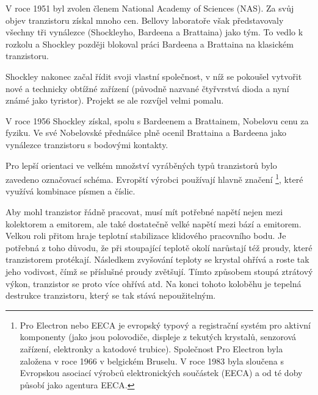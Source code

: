 \begin{mdframed}[style=mdnote]
      {\centering
        \captionsetup{type=figure}
      \par}

      V roce 1951 byl zvolen členem National Academy of Sciences (NAS). Za svůj objev tranzistoru
      získal mnoho cen. Bellovy laboratoře však představovaly všechny tři vynálezce (Shockleyho,
      Bardeena a Brattaina) jako tým. To vedlo k rozkolu a Shockley později blokoval práci Bardeena
      a Brattaina na klasickém tranzistoru.

      Shockley nakonec začal řídit svoji vlastní společnost, v níž se pokoušel vytvořit nové a
      technicky obtížné zařízení (původně nazvané čtyřvrstvá dioda a nyní známé jako tyristor).
      Projekt se ale rozvíjel velmi pomalu. 

      V roce 1956 Shockley získal, spolu s Bardeenem a Brattainem, Nobelovu cenu za fyziku. Ve své
      Nobelovské přednášce plně ocenil Brattaina a Bardeena jako vynálezce tranzistoru s bodovými
      kontakty.
    \end{mdframed}
    
    Pro lepší orientaci ve velkém množství vyráběných typů tranzistorů bylo zavedeno označovací
    schéma. Evropští výrobci používají hlavně značení \footnote{Pro Electron nebo
    EECA je evropský typový a registrační systém pro aktivní komponenty (jako jsou polovodiče,
    displeje z tekutých krystalů, senzorová zařízení, elektronky a katodové trubice). Společnost Pro
    Electron byla založena v roce 1966 v belgickém Bruselu. V roce 1983 byla sloučena s Evropskou
    asociací výrobců elektronických součástek (EECA) a od té doby působí jako agentura EECA.},
    které využívá kombinace písmen a číslic.

    Aby mohl tranzistor řádně pracovat, musí mít potřebné napětí nejen mezi kolektorem a emitorem,
    ale také dostatečně velké napětí mezi bází a emitorem. Velkou roli přitom hraje teplotní
    stabilizace klidového pracovního bodu. Je potřebná z toho důvodu, že při stoupající teplotě
    okolí narůstají též proudy, které tranzistorem protékají. Následkem zvyšování teploty se krystal
    ohřívá a roste tak jeho vodivost, čímž se příslušné proudy zvětšují. Tímto způsobem stoupá
    ztrátový výkon, tranzistor se proto více ohřívá atd. Na konci tohoto koloběhu je tepelná
    destrukce tranzistoru, který se tak stává nepoužitelným.

